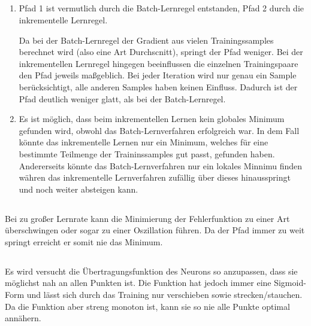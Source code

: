 \documentclass[DIN, pagenumber=false, fontsize=11pt, parskip=half]{scrartcl}
\begin{document}
    \subsection{}
    \begin{enumerate}[label=(\alph*)]
        \item Pfad 1 ist vermutlich durch die Batch-Lernregel entstanden, Pfad 2 durch die inkrementelle Lernregel. 

            Da bei der Batch-Lernregel der Gradient aus vielen Trainingssamples berechnet wird (also eine Art Durchscnitt), springt der Pfad weniger.
            Bei der inkrementellen Lernregel hingegen beeinflussen die einzelnen Trainingspaare den Pfad jeweils maßgeblich. Bei jeder Iteration wird nur genau ein Sample berücksichtigt, alle anderen Samples haben keinen Einfluss. Dadurch ist der Pfad deutlich weniger glatt, als bei der Batch-Lernregel.

        \item Es ist möglich, dass beim inkrementellen Lernen kein globales Minimum gefunden wird, obwohl das Batch-Lernverfahren erfolgreich war. In dem Fall könnte das inkrementelle Lernen nur ein Minimum, welches für eine bestimmte Teilmenge der Traininssamples gut passt, gefunden haben. Andererseits könnte das Batch-Lernverfahren nur ein lokales Minnimu finden währen das inkrementelle Lernverfahren \glqq{}zufällig\grqq{} über dieses hinausspringt und noch weiter absteigen kann.
    \end{enumerate}
    \subsection{}
    Bei zu großer Lernrate kann die Minimierung der Fehlerfunktion zu einer Art überschwingen oder sogar zu einer Oszillation führen. Da der Pfad immer zu weit \glqq{}springt\grqq{} erreicht er somit nie das Minimum.
    \subsection{}
    Es wird versucht die Übertragungsfunktion des Neurons so anzupassen, dass sie möglichst nah an allen Punkten ist. Die Funktion hat jedoch immer eine Sigmoid-Form und lässt sich durch das Training nur verschieben sowie strecken/stauchen. Da die Funktion aber streng monoton ist, kann sie so nie alle Punkte optimal annähern.
\end{document}
